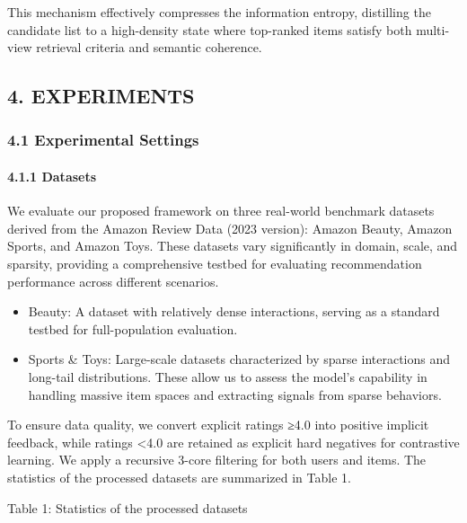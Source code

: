 \documentclass[]{article}
\let\oldparagraph\paragraph
\renewcommand{\paragraph}[1]{\oldparagraph{#1}\mbox{}}
\begin{document}
This mechanism effectively compresses the information entropy,
distilling the candidate list to a high-density state where top-ranked
items satisfy both multi-view retrieval criteria and semantic coherence.

\hypertarget{experiments}{%
\subsection{4. EXPERIMENTS}\label{experiments}}

\hypertarget{experimental-settings}{%
\subsubsection{4.1 Experimental Settings}\label{experimental-settings}}

\hypertarget{datasets}{%
\paragraph{4.1.1 Datasets}\label{datasets}}

We evaluate our proposed framework on three real-world benchmark
datasets derived from the Amazon Review Data (2023 version): Amazon
Beauty, Amazon Sports, and Amazon Toys. These datasets vary
significantly in domain, scale, and sparsity, providing a comprehensive
testbed for evaluating recommendation performance across different
scenarios.

\begin{itemize}
\item
  Beauty: A dataset with relatively dense interactions, serving as a
  standard testbed for full-population evaluation.
\end{itemize}

\begin{itemize}
\item
  Sports \& Toys: Large-scale datasets characterized by sparse
  interactions and long-tail distributions. These allow us to assess the
  model's capability in handling massive item spaces and extracting
  signals from sparse behaviors.
\end{itemize}

To ensure data quality, we convert explicit ratings ≥4.0 into positive
implicit feedback, while ratings \textless{}4.0 are retained as explicit
hard negatives for contrastive learning. We apply a recursive 3-core
filtering for both users and items. The statistics of the processed
datasets are summarized in Table 1.

Table 1: Statistics of the processed datasets
\end{document}
